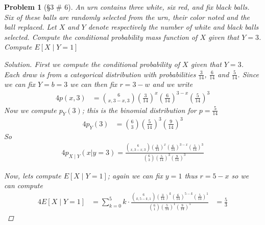 \documentclass[11pt, oneside]{book}   	%
\newtheorem{problem}{Problem}[chapter]
\newcommand{\paren}[1]{\left(#1\right)}
\begin{document}
\begin{problem}[\S 3 \# 6]
	An urn contains three white, six red, and fix black balls. Six of these balls are randomly selected from the urn, their color noted and the ball replaced. Let $X$ and $Y$ denote respectively the number of white and black balls selected. Compute the conditional probability mass function of $X$ given that $Y=3$. Compute $E[X\mid Y=1]$ 
	\begin{proof}[Solution]
		First we compute the conditional probability of $X$ given that $Y=3$. Each draw is from a categorical distribution with probabilities $\frac{3}{14}$, $\frac{6}{14}$ and $\frac{5}{14}$. Since we can fix $Y=b=3$ we can then fix $r=3-w$ and we write 
		\begin{alignat}{4}
			p(x, 3)&=\binom{6}{x, 3-x, 3}\paren{\frac{3}{14}}^x\paren{\frac{6}{14}}^{3-x}\paren{\frac{5}{14}}^3
		\end{alignat}
		Now we compute $p_Y(3)$; this is the binomial distribution for $p=\frac{5}{14}$
		\begin{alignat}{4}
			p_Y(3)&=\binom{6}{3}\paren{\frac{5}{14}}^3\paren{\frac{9}{14}}^3
		\end{alignat}
		So
		\begin{alignat}{4}
			p_{X\mid Y}(x|y=3)=\frac{\binom{6}{x, 3-x, 3}\paren{\frac{3}{14}}^x\paren{\frac{6}{14}}^{3-x}\paren{\frac{5}{14}}^3}{\binom{6}{3}\paren{\frac{5}{14}}^3\paren{\frac{9}{14}}^3}
		\end{alignat}
			
		Now, lets compute $E[X\mid Y=1]$; again we can fix $y=1$ thus $r=5-x$ so we can compute 
		\begin{alignat}{4}
			E[X\mid Y=1]&=\sum_{k=0}^5 k\cdot \frac{ \binom{6}{k, 5-k, 1}\paren{\frac{3}{14}}^k\paren{\frac{6}{14}}^{5-k}\paren{\frac{5}{14}}^1}{\binom{6}{1}\paren{\frac{5}{14}}^1\paren{\frac{9}{14}}^5}
				&=\frac{5}{3}
		\end{alignat}
	\end{proof}
\end{problem}
\end{document}
